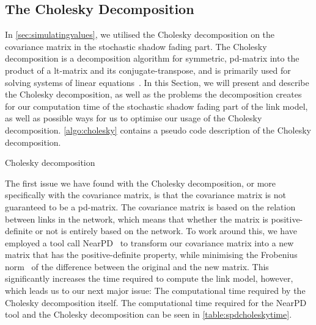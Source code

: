 \subsection{The Cholesky Decomposition}\label{sec:cholesky}
In \autoref{sec:simulatingvalues}, we utilised the Cholesky decomposition on the covariance matrix in the stochastic shadow fading part. The Cholesky decomposition is a decomposition algorithm for \gls{symmetric}, \gls{pd-matrix} into the product of a \gls{lt-matrix} and its \gls{conjugate-transpose}, and is primarily used for solving systems of linear equations~\cite{Press:2007:NRE:1403886}. In this Section, we will present and describe the Cholesky decomposition, as well as the problems the decomposition creates for our computation time of the stochastic shadow fading part of the link model, as well as possible ways for us to optimise our usage of the Cholesky decomposition. \autoref{algo:cholesky} contains a pseudo code description of the Cholesky decomposition. \medbreak

\begin{algorithm}[H]
    \DontPrintSemicolon
    \caption{Cholesky decomposition}
    \label{algo:cholesky}
\end{algorithm}
\medbreak
The first issue we have found with the Cholesky decomposition, or more specifically with the covariance matrix, is that the covariance matrix is not guaranteed to be a \gls{pd-matrix}. The covariance matrix is based on the relation between links in the network, which means that whether the matrix is positive-definite or not is entirely based on the network. To work around this, we have employed a tool call NearPD~\cite{website:nearPD} to transform our covariance matrix into a new matrix that has the positive-definite property, while minimising the Frobenius norm~\cite{website:frobieniusnorm} of the difference between the original and the new matrix. This significantly increases the time required to compute the link model, however, which leads us to our next major issue: The computational time required by the Cholesky decomposition itself. The computational time required for the NearPD tool and the Cholesky decomposition can be seen in \autoref{table:spdcholeskytime}.\smallbreak

